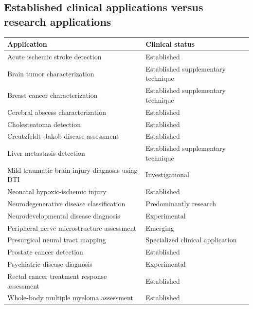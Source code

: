 \subsection{Established clinical applications versus research applications}
\begin{longtable}{@{}p{}p{}@{}}
\toprule
\textbf{Application} & \textbf{Clinical status} \\
\midrule
Acute ischemic stroke detection & Established \\
Brain tumor characterization & Established supplementary technique \\
Breast cancer characterization & Established supplementary technique \\
Cerebral abscess characterization & Established \\
Cholesteatoma detection & Established \\
Creutzfeldt--Jakob disease assessment & Established \\
Liver metastasis detection & Established supplementary technique \\
Mild traumatic brain injury diagnosis using DTI & Investigational \\
Neonatal hypoxic-ischemic injury & Established \\
Neurodegenerative disease classification & Predominantly research \\
Neurodevelopmental disease diagnosis & Experimental \\
Peripheral nerve microstructure assessment & Emerging \\
Presurgical neural tract mapping & Specialized clinical application \\
Prostate cancer detection & Established \\
Psychiatric disease diagnosis & Experimental \\
Rectal cancer treatment response assessment & Established \\
Whole-body multiple myeloma assessment & Established \\
\bottomrule
\end{longtable}

